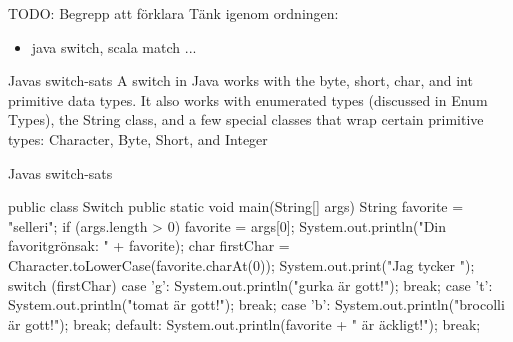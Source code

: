 


\begin{Slide}{TODO: Begrepp att förklara}
  Tänk igenom ordningen:
  \begin{itemize}
    \item java switch, scala match ... 
  \end{itemize}
\end{Slide}


\begin{Slide}{Javas switch-sats}
A switch in Java works with the byte, short, char, and int primitive data types. It also works with enumerated types (discussed in Enum Types), the String class, and a few special classes that wrap certain primitive types: Character, Byte, Short, and Integer
\end{Slide}


\begin{Slide}{Javas switch-sats}

\begin{Code}[language=Java]
public class Switch {
    public static void main(String[] args) {
        String favorite = "selleri";
        if (args.length > 0) {
            favorite = args[0];
        }
        System.out.println("Din favoritgrönsak: " + favorite);
        char firstChar = Character.toLowerCase(favorite.charAt(0));
        System.out.print("Jag tycker ");
        switch (firstChar) {
        case 'g': 
            System.out.println("gurka är gott!");
            break;
        case 't': 
            System.out.println("tomat är gott!");
            break;
        case 'b': 
            System.out.println("brocolli är gott!");
            break;
        default:
            System.out.println(favorite + " är äckligt!");
            break;
        }
    }
}
\end{Code}
\end{Slide}













